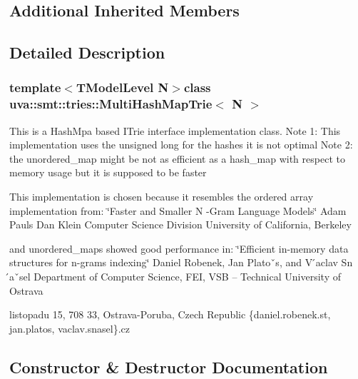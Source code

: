 \subsection*{Additional Inherited Members}


\subsection{Detailed Description}
\subsubsection*{template$<$T\+Model\+Level N$>$class uva\+::smt\+::tries\+::\+Multi\+Hash\+Map\+Trie$<$ N $>$}

This is a Hash\+Mpa based I\+Trie interface implementation class. Note 1\+: This implementation uses the unsigned long for the hashes it is not optimal Note 2\+: the unordered\+\_\+map might be not as efficient as a hash\+\_\+map with respect to memory usage but it is supposed to be faster

This implementation is chosen because it resembles the ordered array implementation from\+: \char`\"{}\+Faster and Smaller N -\/\+Gram Language Models\char`\"{} Adam Pauls Dan Klein Computer Science Division University of California, Berkeley

and unordered\+\_\+maps showed good performance in\+: \char`\"{}\+Efficient in-\/memory data structures for n-\/grams indexing\char`\"{} Daniel Robenek, Jan Platoˇs, and V ́aclav Sn ́aˇsel Department of Computer Science, F\+E\+I, V\+S\+B – Technical University of Ostrava
\begin{DoxyEnumerate}
\item listopadu 15, 708 33, Ostrava-\/\+Poruba, Czech Republic \{daniel.\+robenek.\+st, jan.\+platos, vaclav.\+snasel\}.cz 
\end{DoxyEnumerate}

\subsection{Constructor \& Destructor Documentation}
\hypertarget{classuva_1_1smt_1_1tries_1_1_multi_hash_map_trie_a33184c09e7b63bcdbfad0443492cab93}{}

